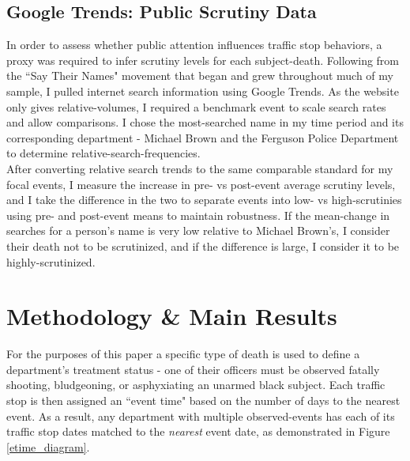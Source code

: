 \subsection{Google Trends: Public Scrutiny Data}
In order to assess whether public attention influences traffic stop behaviors, a proxy was required to infer scrutiny levels for each subject-death. Following from the ``Say Their Names" movement that began and grew throughout much of my sample, I pulled internet search information using Google Trends. As the website only gives relative-volumes, I required a benchmark event to scale search rates and allow comparisons. I chose the most-searched name in my time period and its corresponding department - Michael Brown and the Ferguson Police Department to determine relative-search-frequencies. \\

After converting relative search trends to the same comparable standard for my focal events, I measure the increase in pre- vs post-event average scrutiny levels, and I take the difference in the two to separate events into low- vs high-scrutinies using pre- and post-event means to maintain robustness. If the mean-change in searches for a person's name is very low relative to Michael Brown's, I consider their death not to be scrutinized, and if the difference is large, I consider it to be highly-scrutinized. 

\section{Methodology \& Main Results}
For the purposes of this paper a specific type of death is used to define a department's treatment status - one of their officers must be observed fatally shooting, bludgeoning, or asphyxiating an unarmed black subject. Each traffic stop is then assigned an ``event time" based on the number of days to the nearest event. As a result, any department with multiple observed-events has each of its traffic stop dates matched to the \textit{nearest} event date, as demonstrated in Figure \ref{etime_diagram}. \\

